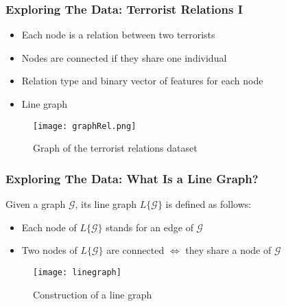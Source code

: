 \begin{frame}
\frametitle{Exploring The Data: Terrorist Relations I}
	
	\begin{itemize}
		\item  Each node is a relation between two terrorists
		\item  Nodes are connected if they share one individual
		\item  Relation type and binary vector of features for each node
		\item  Line graph
	\end{itemize}
	
	\begin{figure}
		\begin{center}
			\texttt{[image: graphRel.png]}
			\caption{Graph of the terrorist relations dataset}
			\label{fig:graph relations}
		\end{center}
	\end{figure}
	
\end{frame}

\begin{frame}
\frametitle{Exploring The Data: What Is a Line Graph?}

\begin{definition}
	Given a graph $\mathcal{G}$, its line graph $L\{\mathcal{G}\}$ is defined as follows: 
	\begin{itemize}
		\item Each node of $L\{\mathcal{G}\}$ stands for an edge of $\mathcal{G}$
		\item Two nodes of $L\{\mathcal{G}\}$ are connected $\Leftrightarrow$ they share a node of $\mathcal{G}$
	\end{itemize}
\end{definition}

\begin{figure}
		\begin{center}
			\texttt{[image: linegraph]}
			\caption{Construction of a line graph}
			\label{fig:line graph}
		\end{center}
	\end{figure}

\end{frame}

